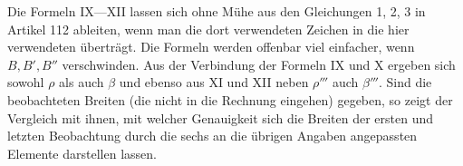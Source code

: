 Die Formeln IX—XII lassen sich ohne Mühe aus den Gleichungen 1, 2, 3 in Artikel 112 ableiten, wenn man die dort verwendeten Zeichen in die hier verwendeten überträgt. Die Formeln werden offenbar viel einfacher, wenn $B,B',B''$ verschwinden. Aus der Verbindung der Formeln IX und X ergeben sich sowohl $\rho$ als auch $\beta$ und ebenso aus XI und XII neben $\rho'''$ auch $\beta'''$. Sind die beobachteten Breiten (die nicht in die Rechnung eingehen) gegeben, so zeigt der Vergleich mit ihnen, mit welcher Genauigkeit sich die Breiten der ersten und letzten Beobachtung durch die sechs an die übrigen Angaben angepassten Elemente darstellen lassen.
